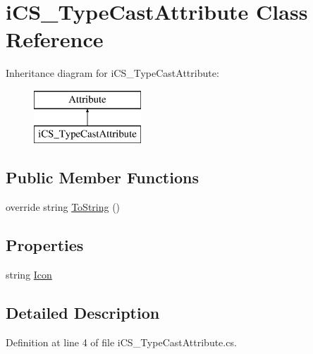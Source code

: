 \hypertarget{classi_c_s___type_cast_attribute}{\section{i\+C\+S\+\_\+\+Type\+Cast\+Attribute Class Reference}
\label{classi_c_s___type_cast_attribute}
}
Inheritance diagram for i\+C\+S\+\_\+\+Type\+Cast\+Attribute\+:\begin{figure}[H]
\begin{center}
\leavevmode
\includegraphics[height=2.000000cm]{classi_c_s___type_cast_attribute}
\end{center}
\end{figure}
\subsection*{Public Member Functions}
\begin{DoxyCompactItemize}
\item 
override string \hyperlink{classi_c_s___type_cast_attribute_aaeae76aa36a4064f3dd23ee3b41a72bb}{To\+String} ()
\end{DoxyCompactItemize}
\subsection*{Properties}
\begin{DoxyCompactItemize}
\item 
string \hyperlink{classi_c_s___type_cast_attribute_a75c13ff35c0185fe46dc567602c5ae88}{Icon}
\end{DoxyCompactItemize}


\subsection{Detailed Description}


Definition at line 4 of file i\+C\+S\+\_\+\+Type\+Cast\+Attribute.\+cs.



